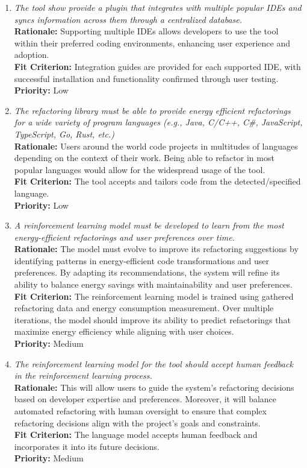 \documentclass[12pt]{article}
\begin{document}
\begin{enumerate}[label=WTRM \arabic*., wide=0pt, leftmargin=*]
    {\bf Priority:} High
  \item \emph{The tool show provide a plugin that integrates with
      multiple popular IDEs and syncs information across them through a
    centralized database.}\\[2mm]
    {\bf Rationale:} Supporting multiple IDEs allows developers to
    use the tool within their preferred coding environments,
    enhancing user experience and adoption.\\
    {\bf Fit Criterion:} Integration guides are provided for each
    supported IDE, with successful installation and functionality
    confirmed through user testing.\\
    {\bf Priority:} Low
  \item \emph{The refactoring library must be able to provide energy
      efficient refactorings for a wide variety of program languages
    (e.g., Java, C/C++, C\#, JavaScript, TypeScript, Go, Rust, etc.)}\\[2mm]
    {\bf Rationale:} Users around the world code projects in
    multitudes of languages depending on the context of their work.
    Being able to refactor in most popular languages would allow for
    the widespread usage of the tool.\\
    {\bf Fit Criterion:} The tool accepts and tailors code from the
    detected/specified language.\\
    {\bf Priority:} Low
  \item \emph{A reinforcement learning model must be developed to
      learn from the most energy-efficient refactorings and user
    preferences over time.}\\[2mm]
    {\bf Rationale:} The model must evolve to improve its refactoring
    suggestions by identifying patterns in energy-efficient code
    transformations and user preferences. By adapting its
    recommendations, the system will refine its ability to balance
    energy savings with maintainability and user preferences.\\
    {\bf Fit Criterion:} The reinforcement learning model is trained
    using gathered refactoring data and energy consumption
    measurement. Over multiple iterations, the model should improve
    its ability to predict refactorings that maximize energy
    efficiency while aligning with user choices.\\
    {\bf Priority:} Medium
  \item \emph{The reinforcement learning model for the tool should
    accept human feedback in the reinforcement learning process.}\\[2mm]
    {\bf Rationale:} This will allow users to guide the system's
    refactoring decisions based on developer expertise and
    preferences. Moreover, it will balance automated refactoring with
    human oversight to ensure that complex refactoring decisions
    align with the project's goals and constraints.\\
    {\bf Fit Criterion:} The language model accepts human feedback
    and incorporates it into its future decisions.\\
    {\bf Priority:} Medium
\end{enumerate}
\end{document}
